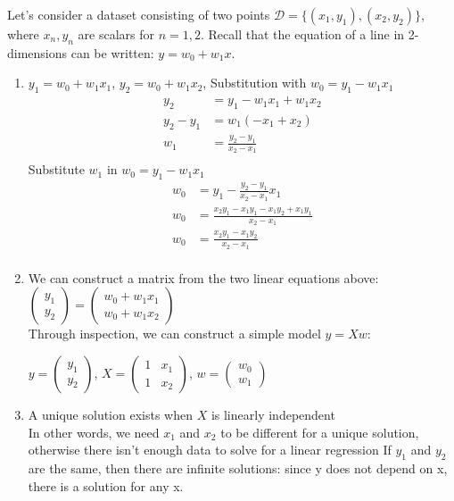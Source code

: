 \documentclass{harvardml}
\theoremstyle{definition}
\theoremstyle{plain}
\begin{document}
\begin{solution}

\noindent Let's consider a dataset consisting of two points $\mathcal{D} = \{(x_1, y_1), (x_2, y_2)\}$, where $x_n, y_n$ are scalars for $n=1, 2$. Recall that the equation of a line in 2-dimensions can be written: $y = w_0 + w_1x$. 
\begin{enumerate}
    \item $y_1 = w_0+w_1x_1$, $y_2 = w_0+w_1x_2$, Substitution with $w_0 = y_1-w_1x_1$
    \begin{align*}
        y_2 &= y_1-w_1x_1+w_1x_2\\
        y_2-y_1 &= w_1(-x_1+x_2)\\
        w_1 &= \frac{y_2-y_1}{x_2-x_1}\\
    \end{align*}
    Substitute $w_1$ in $w_0 = y_1-w_1x_1$
    \begin{align*}
        w_0 &= y_1 - \frac{y_2-y_1}{x_2-x_1}x_1\\
        w_0 &= \frac{x_2y_1-x_1y_1-x_1y_2+x_1y_1}{x_2-x_1}\\
        w_0 &= \frac{x_2y_1-x_1y_2}{x_2-x_1}\\
    \end{align*}
    \item We can construct a matrix from the two linear equations above:
    $\begin{pmatrix} y_1 \\ y_2 \end{pmatrix} 
    = \begin{pmatrix} w_0 + w_1x_1 \\ w_0+w_1x_2 \end{pmatrix}$\\
    Through inspection, we can construct a simple model $y=Xw$:
    \begin{center}
    $y = \begin{pmatrix} y_1 \\ y_2 \end{pmatrix}$,
    $X = \begin{pmatrix} 1 & x_1 \\ 1 & x_2\end{pmatrix}$,
    $w = \begin{pmatrix} w_0 \\ w_1\end{pmatrix}$
    \end{center}
    \item A unique solution exists when $X$ is linearly independent\\
    In other words, we need $x_1$ and $x_2$ to be different for a unique solution,
    otherwise there isn't enough data to solve for a linear regression
    If $y_1$ and $y_2$ are the same, then there are infinite solutions: 
    since y does not depend on x, there is a solution for any x.


\end{enumerate}
\end{solution}
\end{document}

